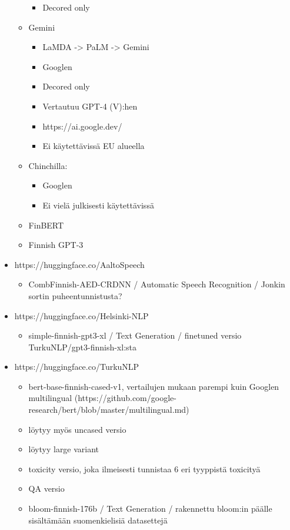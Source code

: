 \begin{itemize}
\begin{itemize}
\begin{itemize}
      \item Decored only
    \end{itemize}
    \item Gemini
    \begin{itemize}
      \item LaMDA -> PaLM -> Gemini
      \item Googlen
      \item Decored only
      \item Vertautuu GPT-4 (V):hen
      \item https://ai.google.dev/
      \item Ei käytettävissä EU alueella
    \end{itemize}
    \item Chinchilla:
    \begin{itemize}
      \item Googlen
      \item Ei vielä julkisesti käytettävissä
    \end{itemize}
    \item FinBERT
    \item Finnish GPT-3
  \end{itemize}
  \item https://huggingface.co/AaltoSpeech
  \begin{itemize}
    \item CombFinnish-AED-CRDNN / Automatic Speech Recognition / Jonkin sortin puheentunnistusta?
  \end{itemize}
  \item https://huggingface.co/Helsinki-NLP
  \begin{itemize}
    \item simple-finnish-gpt3-xl / Text Generation / finetuned versio TurkuNLP/gpt3-finnish-xl:sta
  \end{itemize}
  \item https://huggingface.co/TurkuNLP
  \begin{itemize}
    \item bert-base-finnish-cased-v1, vertailujen mukaan parempi kuin Googlen multilingual (https://github.com/google-research/bert/blob/master/multilingual.md)
    \item löytyy myös uncased versio
    \item löytyy large variant
    \item toxicity versio, joka ilmeisesti tunnistaa 6 eri tyyppistä toxicityä
    \item QA versio
    \item bloom-finnish-176b / Text Generation / rakennettu bloom:in päälle sisältämään suomenkielisiä datasettejä

\end{itemize}
\end{itemize}
